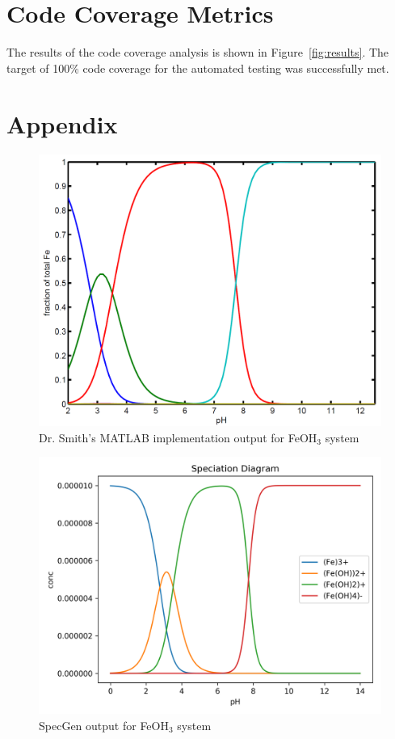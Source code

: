 \documentclass[12pt, titlepage]{article}
\newcommand{\progname}{SpecGen}
\begin{document}
\section{Code Coverage Metrics}
The results of the code coverage analysis is shown in Figure~\ref{fig:results}.
The target of 100\% code coverage for the automated testing was successfully met. 

\newpage
\section{Appendix}
\begin{figure}[!h]
\centering
\includegraphics[width=\textwidth]{orig_ref}
\caption{Dr. Smith's MATLAB implementation output for FeOH$_3$ system} \label{fig:orig}
\end{figure}
\begin{figure}[!h]
\centering
\includegraphics[width=\textwidth]{fe_syst}
\caption{\progname{} output for FeOH$_3$ system} \label{fig:gen}
\end{figure}
\end{document}
